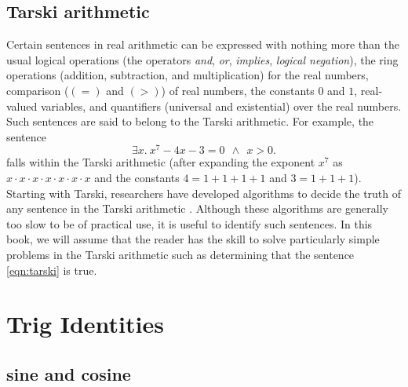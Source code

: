 \subsection{Tarski arithmetic}

\label{back:tarski}
  Certain sentences in real arithmetic can be expressed with nothing
  more than the usual logical operations (the operators {\it and},
  {\it or}, {\it implies}, {\it logical negation}), the ring
  operations (addition, subtraction, and multiplication) for the real
  numbers, comparison ($(=)$ and $(>)$) of real numbers, the constants
  $0$ and $1$, real-valued variables, and quantifiers (universal and
  existential) over the real numbers.  Such sentences are said to
  belong to the Tarski arithmetic.  For example, the sentence
\begin{equation}\label{eqn:tarski}
\exists x.~x^7 - 4 x - 3 = 0 ~~\land~~ x > 0.
\end{equation}
falls within the Tarski arithmetic (after expanding the exponent $x^7$
as $x\cdot x\cdot x\cdot x\cdot x\cdot x\cdot x$ and the constants
$4=1+1+1+1$ and $3=1+1+1$).  Starting with Tarski, researchers have
developed algorithms to decide the truth of any sentence in the Tarski
arithmetic \cite{unknown}. %
Although these algorithms are generally too slow to be of practical
use, it is useful to identify such sentences.  In this book, we will
assume that the reader has the skill to solve particularly simple
problems in the Tarski arithmetic such as determining that the
sentence \eqref{eqn:tarski} is true.


\section{Trig Identities}


\subsection{sine and cosine}

